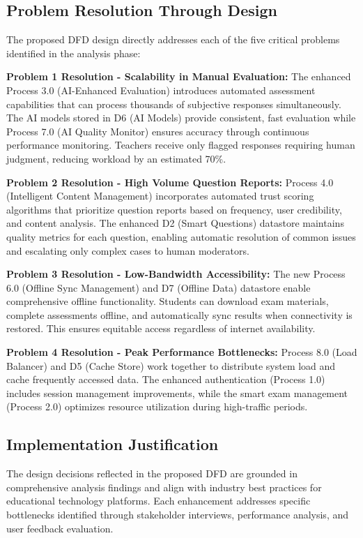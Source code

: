 \documentclass[12pt,a4paper,oneside]{book}
\begin{document}
\subsection{Problem Resolution Through Design}

The proposed DFD design directly addresses each of the five critical problems identified in the analysis phase:

\textbf{Problem 1 Resolution - Scalability in Manual Evaluation:}
The enhanced Process 3.0 (AI-Enhanced Evaluation) introduces automated assessment capabilities that can process thousands of subjective responses simultaneously. The AI models stored in D6 (AI Models) provide consistent, fast evaluation while Process 7.0 (AI Quality Monitor) ensures accuracy through continuous performance monitoring. Teachers receive only flagged responses requiring human judgment, reducing workload by an estimated 70\%.

\textbf{Problem 2 Resolution - High Volume Question Reports:}
Process 4.0 (Intelligent Content Management) incorporates automated trust scoring algorithms that prioritize question reports based on frequency, user credibility, and content analysis. The enhanced D2 (Smart Questions) datastore maintains quality metrics for each question, enabling automatic resolution of common issues and escalating only complex cases to human moderators.

\textbf{Problem 3 Resolution - Low-Bandwidth Accessibility:}
The new Process 6.0 (Offline Sync Management) and D7 (Offline Data) datastore enable comprehensive offline functionality. Students can download exam materials, complete assessments offline, and automatically sync results when connectivity is restored. This ensures equitable access regardless of internet availability.

\textbf{Problem 4 Resolution - Peak Performance Bottlenecks:}
Process 8.0 (Load Balancer) and D5 (Cache Store) work together to distribute system load and cache frequently accessed data. The enhanced authentication (Process 1.0) includes session management improvements, while the smart exam management (Process 2.0) optimizes resource utilization during high-traffic periods.




\subsection{Implementation Justification}

The design decisions reflected in the proposed DFD are grounded in comprehensive analysis findings and align with industry best practices for educational technology platforms. Each enhancement addresses specific bottlenecks identified through stakeholder interviews, performance analysis, and user feedback evaluation.
\end{document}
